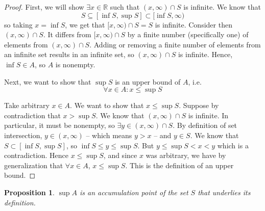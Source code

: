 \documentclass[letterpaper,11pt]{article}
\newtheorem{prop}{Proposition}
\newcommand{\R}{\mathbb{R}}
\begin{document}
\begin{proof}
    First, we will show $\exists x \in \R$ such that $(x, \infty) \cap S$ is
    infinite. We know that
    \begin{equation*}
        S \subseteq [\inf{S}, \sup{S}] \subset [\inf{S}, \infty)
    \end{equation*}
    so taking $x = \inf{S}$, we get that $[x, \infty) \cap S = S$ is infinite.
    Consider then $(x, \infty) \cap S$. It differs from $[x, \infty) \cap S$ by
    a finite number (specifically one) of elements from $(x, \infty) \cap S$.
    Adding or removing a finite number of elements from an infinite set results
    in an infinite set, so $(x, \infty) \cap S$ is infinite.
    Hence, $\inf{S} \in A$, so $A$ is nonempty.

    Next, we want to show that $\sup{S}$ is an upper bound of $A$, i.e.
    \begin{equation*}
        \forall x \in A: x \leq \sup{S}
    \end{equation*}

    Take arbitrary $x \in A$. We want to show that $x \leq \sup{S}$. Suppose by
    contradiction that $x > \sup{S}$. We know that $(x, \infty) \cap S$ is
    infinite. In particular, it must be nonempty, so
    $\exists y \in (x, \infty) \cap S$. By definition of set intersection,
    $y \in (x, \infty)$ -- which means $y > x$ -- and $y \in S$. We know that
    $S \subset [\inf{S}, \sup{S}]$, so $\inf{S} \leq y \leq \sup{S}$. But
    $y \leq \sup{S} < x < y$ which is a contradiction. Hence $x \leq \sup{S}$,
    and since $x$ was arbitrary, we have by generalization that
    $\forall x \in A$, $x \leq \sup{S}$. This is the definition of an upper
    bound.
\end{proof}

\begin{prop}
    $\sup{A}$ is an accumulation point of the set $S$ that underlies its
    definition.
\end{prop}
\end{document}
